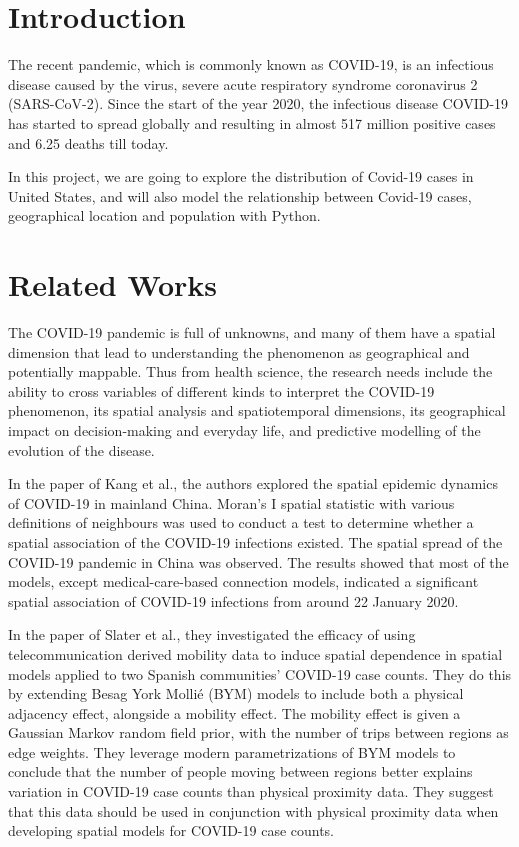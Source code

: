 \documentclass{article}
\begin{document}
\section{Introduction}
The recent pandemic, which is commonly known as COVID-19, is an infectious disease caused by the virus, severe acute respiratory syndrome coronavirus 2 (SARS-CoV-2). Since the start of the year 2020, the infectious disease COVID-19 has started to spread globally and resulting in almost 517 million positive cases and 6.25 deaths till today.

In this project, we are going to explore the distribution of Covid-19 cases in United States, and will also model the relationship between Covid-19 cases, geographical location and population with Python.

\section{Related Works}
The COVID-19 pandemic is full of unknowns, and many of them have a spatial dimension that lead to understanding the phenomenon as geographical and potentially mappable. Thus from health science, the research needs include the ability to cross variables of different kinds to interpret the COVID-19 phenomenon, its spatial analysis and spatiotemporal dimensions, its geographical impact on decision-making and everyday life, and predictive modelling of the evolution of the disease.

In the paper of Kang et al., the authors explored the spatial epidemic dynamics of COVID-19 in mainland China\cite{kang2020spatial}. Moran's I spatial statistic with various definitions of neighbours was used to conduct a test to determine whether a spatial association of the COVID-19 infections existed. The spatial spread of the COVID-19 pandemic in China was observed. The results showed that most of the models, except medical-care-based connection models, indicated a significant spatial association of COVID-19 infections from around 22 January 2020.

In the paper of Slater et al., they investigated the efficacy of using telecommunication derived mobility data to induce spatial dependence in spatial models applied to two Spanish communities' COVID-19 case counts\cite{slater2021capturing}. They do this by extending Besag York Mollié (BYM) models to include both a physical adjacency effect, alongside a mobility effect. The mobility effect is given a Gaussian Markov random field prior, with the number of trips between regions as edge weights. They leverage modern parametrizations of BYM models to conclude that the number of people moving between regions better explains variation in COVID-19 case counts than physical proximity data. They suggest that this data should be used in conjunction with physical proximity data when developing spatial models for COVID-19 case counts.
\end{document}
